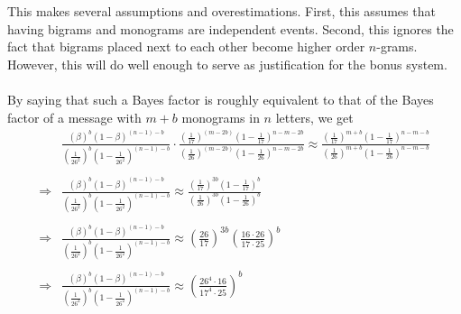 This makes several assumptions and overestimations. First, this
assumes that having bigrams and monograms are independent events.
Second, this ignores the fact that bigrams placed next to each
other become higher order $n$-grams. However, this will do well
enough to serve as justification for the bonus system.
\\\\By saying that such a Bayes factor is roughly equivalent to
that of the Bayes factor of a message with $m+b$ monograms in $n$
letters, we get
\begin{align*}
	            &
	\frac{(\beta)^b(1-\beta)^{(n-1)-b}}{(\frac{1}{26^2})^b(1-\frac{1}{26^2})^{(n-1)-b}}\cdot\frac{(\frac{1}{17})^{(m-2b)}(1-\frac{1}{17})^{n-m-2b}}{(\frac{1}{26})^{(m-2b)}(1-\frac{1}{26})^{n-m-2b}}
	\approx
	\frac{(\frac{1}{17})^{m+b}(1-\frac{1}{17})^{n-m-b}}{(\frac{1}{26})^{m+b}(1-\frac{1}{26})^{n-m-b}}
	\\\\
	\Rightarrow &
	\frac{(\beta)^b(1-\beta)^{(n-1)-b}}{(\frac{1}{26^2})^b(1-\frac{1}{26^2})^{(n-1)-b}}\approx
	\frac{(\frac{1}{17})^{3b}(1-\frac{1}{17})^{b}}{(\frac{1}{26})^{3b}(1-\frac{1}{26})^{b}}
	\\\\
	\Rightarrow &
	\frac{(\beta)^b(1-\beta)^{(n-1)-b}}{(\frac{1}{26^2})^b(1-\frac{1}{26^2})^{(n-1)-b}}\approx
	(\frac{26}{17})^{3b}(\frac{16\cdot26}{17\cdot25})^b
	\\\\
	\Rightarrow &
	\frac{(\beta)^b(1-\beta)^{(n-1)-b}}{(\frac{1}{26^2})^b(1-\frac{1}{26^2})^{(n-1)-b}}\approx
	(\frac{26^4\cdot16}{17^4\cdot25})^b
\end{align*}


